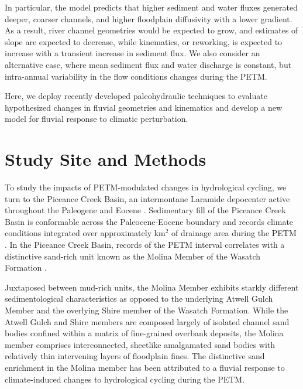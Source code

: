 \documentclass[draft]{compact_proposal}
\newcommand{\del}[3]{\ce{\delta^#1#2_{#3}}}
\begin{document}
In particular, the \cnote[BZF] model predicts that higher sediment and water fluxes generated deeper, coarser channels, and higher floodplain diffusivity with a lower gradient.
As a result, river channel geometries would be expected to grow, and estimates of slope are expected to decrease, while kinematics, or reworking, is expected to increase with a transient increase in sediment flux.
We also consider an alternative case, where mean sediment flux and water discharge is constant, but intra-annual variability in the flow conditions changes during the PETM.

Here, we deploy recently developed paleohydraulic techniques to evaluate hypothesized changes in fluvial geometries and kinematics and develop a new model for fluvial response to climatic perturbation.

\section{Study Site and Methods}


To study the impacts of PETM-modulated changes in hydrological cycling, we turn to the Piceance Creek Basin, an intermontane Laramide depocenter active throughout the Paleogene and Eocene \cnote.
Sedimentary fill of the Piceance Creek Basin is conformable across the Paleocene-Eocene boundary and records climate conditions integrated over approximately  km$^2$ of drainage area during the PETM \cnote.
In the Piceance Creek Basin, \del{13}{C}{org} records of the PETM interval correlates with a distinctive sand-rich unit known as the Molina Member of the Wasatch Formation \cnote[bzf].

Juxtaposed between mud-rich units, the Molina Member exhibits starkly different sedimentological characteristics as opposed to the underlying Atwell Gulch Member and the overlying Shire member of the Wasatch Formation.
While the Atwell Gulch and Shire members are composed largely of isolated channel sand bodies confined within a matrix of fine-grained overbank deposits, the Molina member comprises interconnected, sheetlike amalgamated sand bodies with relatively thin intervening layers of floodplain fines.
The distinctive sand enrichment in the Molina member has been attributed to a fluvial response to climate-induced changes to hydrological cycling during the PETM.
\end{document}
